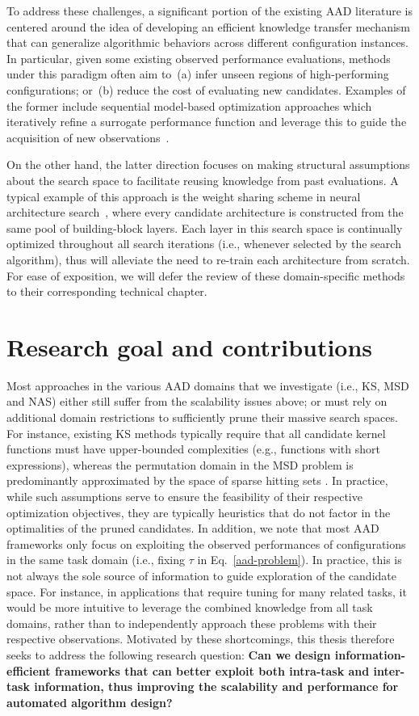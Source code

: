 To address these challenges, a significant portion of the existing AAD literature is centered around the idea of developing an efficient knowledge transfer mechanism that can generalize algorithmic behaviors across different configuration instances. In particular, given some existing observed performance evaluations, methods under this paradigm often aim to~(a) infer unseen regions of high-performing configurations; or~(b) reduce the cost of evaluating new candidates. Examples of the former include sequential model-based optimization approaches which iteratively refine a surrogate performance function and leverage this to guide the acquisition of new observations~\cite{Kandasamy18, Lu18}. 

On the other hand, the latter direction focuses on making structural assumptions about the search space to facilitate reusing knowledge from past evaluations. A typical example of this approach is the weight sharing scheme in neural architecture search~\cite{pham2018, he2020fednas}, where every candidate architecture is constructed from the same pool of building-block layers. Each layer in this search space is continually optimized throughout all search iterations (i.e., whenever selected by the search algorithm), thus will alleviate the need to re-train each architecture from scratch. For ease of exposition, we will defer the review of these domain-specific methods to their corresponding technical chapter.

\section{Research goal and contributions}
Most approaches in the various AAD domains that we investigate (i.e., KS, MSD and NAS) either still suffer from the scalability issues above; or must rely on additional domain restrictions to sufficiently prune their massive search spaces. For instance, existing KS methods \cite{Duvenaud13,Malkomes16,Lu18} typically require that all candidate kernel functions must have upper-bounded complexities (e.g., functions with short expressions), whereas the permutation domain in the MSD problem is predominantly approximated by the space of sparse hitting sets \cite{zheng20miniception,ekim20pasha}. In practice, while such assumptions serve to ensure the feasibility of their respective optimization objectives, they are typically heuristics that do not factor in the optimalities of the pruned candidates. In addition, we note that most AAD frameworks only focus on exploiting the observed performances of configurations in the same task domain (i.e., fixing $\tau$ in Eq.~\eqref{aad-problem}). In practice, this is not always the sole source of information to guide exploration of the candidate space. For instance, in applications that require tuning for many related tasks, it would be more intuitive to leverage the combined knowledge from all task domains, rather than to independently approach these problems with their respective observations. Motivated by these shortcomings, this thesis therefore seeks to address the following research question: \textbf{Can we design information-efficient frameworks that can better exploit both intra-task and inter-task information, thus improving the scalability and performance for automated algorithm design?}

